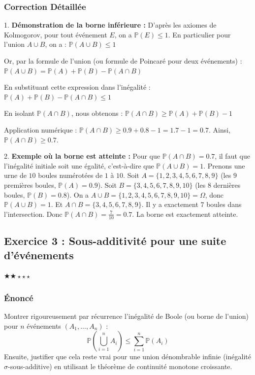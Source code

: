 \documentclass[11pt,a4paper]{article}
\begin{document}
\subsubsection*{Correction Détaillée}

1. \textbf{Démonstration de la borne inférieure :}
D'après les axiomes de Kolmogorov, pour tout événement $E$, on a $\mathbb{P}(E) \le 1$.
En particulier pour l'union $A \cup B$, on a :
$\mathbb{P}(A \cup B) \le 1$

Or, par la formule de l'union (ou formule de Poincaré pour deux événements) :
$\mathbb{P}(A \cup B) = \mathbb{P}(A) + \mathbb{P}(B) - \mathbb{P}(A \cap B)$

En substituant cette expression dans l'inégalité :
$\mathbb{P}(A) + \mathbb{P}(B) - \mathbb{P}(A \cap B) \le 1$

En isolant $\mathbb{P}(A \cap B)$, nous obtenons :
$\mathbb{P}(A \cap B) \ge \mathbb{P}(A) + \mathbb{P}(B) - 1$

Application numérique :
$\mathbb{P}(A \cap B) \ge 0.9 + 0.8 - 1 = 1.7 - 1 = 0.7$.
Ainsi, $\mathbb{P}(A \cap B) \ge 0.7$.

2. \textbf{Exemple où la borne est atteinte :}
Pour que $\mathbb{P}(A \cap B) = 0.7$, il faut que l'inégalité initiale soit une égalité, c'est-à-dire que $\mathbb{P}(A \cup B) = 1$.
Prenons une urne de $10$ boules numérotées de $1$ à $10$.
Soit $A = \{1, 2, 3, 4, 5, 6, 7, 8, 9\}$ (les $9$ premières boules, $\mathbb{P}(A) = 0.9$).
Soit $B = \{3, 4, 5, 6, 7, 8, 9, 10\}$ (les $8$ dernières boules, $\mathbb{P}(B) = 0.8$).
On a $A \cup B = \{1, 2, 3, 4, 5, 6, 7, 8, 9, 10\} = \Omega$, donc $\mathbb{P}(A \cup B) = 1$.
Et $A \cap B = \{3, 4, 5, 6, 7, 8, 9\}$. Il y a exactement $7$ boules dans l'intersection.
Donc $\mathbb{P}(A \cap B) = \frac{7}{10} = 0.7$. La borne est exactement atteinte.



\subsection*{Exercice 3 : Sous-additivité pour une suite d'événements}
$\bigstar\bigstar\star\star\star$

\subsubsection*{Énoncé}

Montrer rigoureusement par récurrence l'inégalité de Boole (ou borne de l'union) pour $n$ événements $(A_1, \dots, A_n)$ :
$$ \mathbb{P}\left(\bigcup_{i=1}^n A_i\right) \le \sum_{i=1}^n \mathbb{P}(A_i) $$
Ensuite, justifier que cela reste vrai pour une union dénombrable infinie (inégalité $\sigma$-sous-additive) en utilisant le théorème de continuité monotone croissante.
\end{document}
